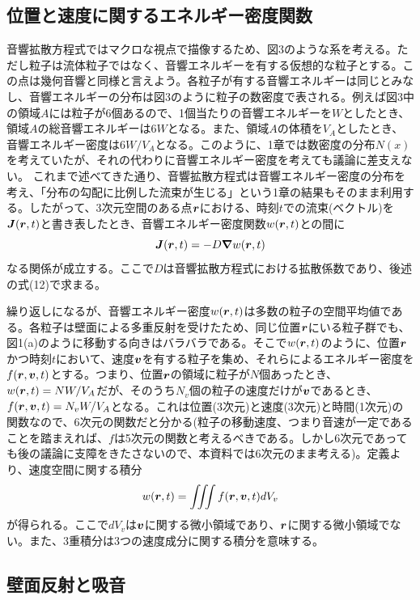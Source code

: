 \documentclass[dvipdfmx, 9pt, a4paper]{jsarticle}
\newcommand{\bm}[1]{{\mbox{\boldmath $#1$}}}
\begin{document}
\subsection{位置と速度に関するエネルギー密度関数}
音響拡散方程式ではマクロな視点で描像するため、図3のような系を考える。ただし粒子は流体粒子ではなく、音響エネルギーを有する仮想的な粒子とする。この点は幾何音響と同様と言えよう。各粒子が有する音響エネルギーは同じとみなし、音響エネルギーの分布は図3のように粒子の数密度で表される。例えば図3中の領域$A$には粒子が6個あるので、1個当たりの音響エネルギーを$W$としたとき、領域$A$の総音響エネルギーは$6W$となる。また、領域$A$の体積を$V_A$としたとき、音響エネルギー密度は$6W/V_A$となる。このように、1章では数密度の分布$N(x)$を考えていたが、それの代わりに音響エネルギー密度を考えても議論に差支えない。
これまで述べてきた通り、音響拡散方程式は音響エネルギー密度の分布を考え、「分布の勾配に比例した流束が生じる」という1章の結果もそのまま利用する。したがって、3次元空間のある点$\bm r$における、時刻$t$での流束(ベクトル)を$\bm J(\bm r, t)$と書き表したとき、音響エネルギー密度関数$w(\bm r, t)$との間に
\begin{equation}
\bm J(\bm r, t)=-D\bm \nabla w(\bm r, t)
\end{equation}
なる関係が成立する。ここで$D$は音響拡散方程式における拡散係数であり、後述の式(12)で求まる。\par
繰り返しになるが、音響エネルギー密度$w(\bm r, t)$は多数の粒子の空間平均値である。各粒子は壁面による多重反射を受けたため、同じ位置$\bm r$にいる粒子群でも、図1(a)のように移動する向きはバラバラである。そこで$w(\bm r, t)$のように、位置$\bm r$かつ時刻$t$において、速度$\bm v$を有する粒子を集め、それらによるエネルギー密度を$f(\bm r, \bm v, t)$とする。つまり、位置$\bm r$の領域に粒子が$N$個あったとき、$w(\bm r, t)=NW/V_A$だが、そのうち$N_v$個の粒子の速度だけが$\bm v$であるとき、$f(\bm r, \bm v, t)=N_vW/V_A$となる。これは位置(3次元)と速度(3次元)と時間(1次元)の関数なので、6次元の関数だと分かる(粒子の移動速度、つまり音速が一定であることを踏まえれば、$f$は5次元の関数と考えるべきである。しかし6次元であっても後の議論に支障をきたさないので、本資料では6次元のまま考える)。定義より、速度空間に関する積分
\begin{equation}
w(\bm r, t)= \iiint f(\bm r, \bm v, t) dV_v
\end{equation}
が得られる。ここで$dV_v$は$\bm v$に関する微小領域であり、$\bm r$に関する微小領域でない。また、3重積分は3つの速度成分に関する積分を意味する。

\subsection{壁面反射と吸音}
\end{document}
